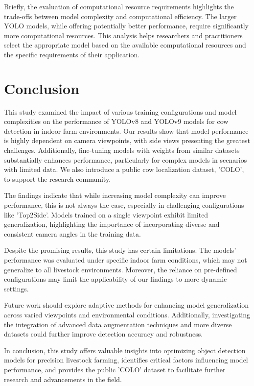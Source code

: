 Briefly, the evaluation of computational resource requirements highlights the trade-offs between model complexity and computational efficiency. The larger YOLO models, while offering potentially better performance, require significantly more computational resources. This analysis helps researchers and practitioners select the appropriate model based on the available computational resources and the specific requirements of their application.



\section{Conclusion}

This study examined the impact of various training configurations and model complexities on the performance of YOLOv8 and YOLOv9 models for cow detection in indoor farm environments. Our results show that model performance is highly dependent on camera viewpoints, with side views presenting the greatest challenges. Additionally, fine-tuning models with weights from similar datasets substantially enhances performance, particularly for complex models in scenarios with limited data. We also introduce a public cow localization dataset, 'COLO', to support the research community.

The findings indicate that while increasing model complexity can improve performance, this is not always the case, especially in challenging configurations like 'Top2Side'. Models trained on a single viewpoint exhibit limited generalization, highlighting the importance of incorporating diverse and consistent camera angles in the training data.

Despite the promising results, this study has certain limitations. The models' performance was evaluated under specific indoor farm conditions, which may not generalize to all livestock environments. Moreover, the reliance on pre-defined configurations may limit the applicability of our findings to more dynamic settings.

Future work should explore adaptive methods for enhancing model generalization across varied viewpoints and environmental conditions. Additionally, investigating the integration of advanced data augmentation techniques and more diverse datasets could further improve detection accuracy and robustness.

In conclusion, this study offers valuable insights into optimizing object detection models for precision livestock farming, identifies critical factors influencing model performance, and provides the public 'COLO' dataset to facilitate further research and advancements in the field.